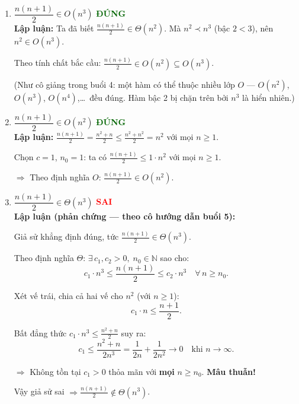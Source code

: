 \documentclass[12pt,a4paper]{article}
\begin{document}
\begin{enumerate}[label=\textbf{\alph*.}]

  \item $\dfrac{n(n+1)}{2} \in O(n^3)$ \hfill \textcolor{darkgreen}{\textbf{ĐÚNG}} \\[4pt]
  \textbf{Lập luận:} Ta đã biết $\frac{n(n+1)}{2} \in \Theta(n^2)$.
  Mà $n^2 \prec n^3$ (bậc $2 < 3$), nên $n^2 \in O(n^3)$.

  Theo tính chất bắc cầu: $\frac{n(n+1)}{2} \in O(n^2) \subseteq O(n^3)$.

  (Như cô giảng trong buổi 4: một hàm có thể thuộc nhiều lớp $O$ --- $O(n^2)$, $O(n^3)$, $O(n^4)$,\ldots\ đều đúng.
  Hàm bậc 2 bị chặn trên bởi $n^3$ là hiển nhiên.)

  \bigskip

  \item $\dfrac{n(n+1)}{2} \in O(n^2)$ \hfill \textcolor{darkgreen}{\textbf{ĐÚNG}} \\[4pt]
  \textbf{Lập luận:} $\frac{n(n+1)}{2} = \frac{n^2 + n}{2} \leq \frac{n^2 + n^2}{2} = n^2$ với mọi $n \geq 1$.

  Chọn $c = 1$, $n_0 = 1$: ta có $\frac{n(n+1)}{2} \leq 1 \cdot n^2$ với mọi $n \geq 1$.

  $\Longrightarrow$ Theo định nghĩa $O$: $\frac{n(n+1)}{2} \in O(n^2)$. \checkmark

  \bigskip

  \item $\dfrac{n(n+1)}{2} \in \Theta(n^3)$ \hfill \textcolor{red}{\textbf{SAI}} \\[4pt]
  \textbf{Lập luận (phản chứng --- theo cô hướng dẫn buổi 5):}

  Giả sử khẳng định đúng, tức $\frac{n(n+1)}{2} \in \Theta(n^3)$.

  Theo định nghĩa $\Theta$: $\exists\, c_1, c_2 > 0,\; n_0 \in \mathbb{N}$ sao cho:
  \[
    c_1 \cdot n^3 \leq \frac{n(n+1)}{2} \leq c_2 \cdot n^3 \quad \forall\, n \geq n_0.
  \]

  Xét vế trái, chia cả hai vế cho $n^2$ (với $n \geq 1$):
  \[
    c_1 \cdot n \leq \frac{n+1}{2}.
  \]

  Bất đẳng thức $c_1 \cdot n^3 \leq \frac{n^2+n}{2}$ suy ra:
  \[
    c_1 \leq \frac{n^2+n}{2n^3} = \frac{1}{2n} + \frac{1}{2n^2} \to 0 \quad \text{khi } n \to \infty.
  \]

  $\Longrightarrow$ Không tồn tại $c_1 > 0$ thỏa mãn với \textbf{mọi} $n \geq n_0$. \textbf{Mâu thuẫn!}

  Vậy giả sử sai $\Rightarrow \frac{n(n+1)}{2} \notin \Theta(n^3)$.


\end{enumerate}
\end{document}
